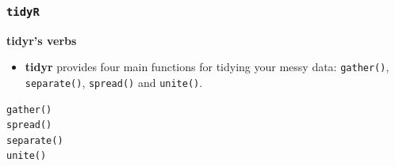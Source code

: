 \documentclass[TIDYMASTER.tex]{subfiles}
\begin{document}
\begin{frame}[fragile]
	\frametitle{\texttt{tidyR} }
\Large
\noindent \textbf{tidyr's verbs}
\begin{itemize}
\item \textbf{tidyr} provides four main functions for tidying your messy data: \texttt{gather()}, \texttt{separate()}, \texttt{spread()} and \texttt{unite()}.
\end{itemize}
{
	\Large
\begin{framed}
\begin{verbatim}
gather()
spread()
separate()
unite()
\end{verbatim}
\end{framed}
}
\end{frame}
\end{document}
